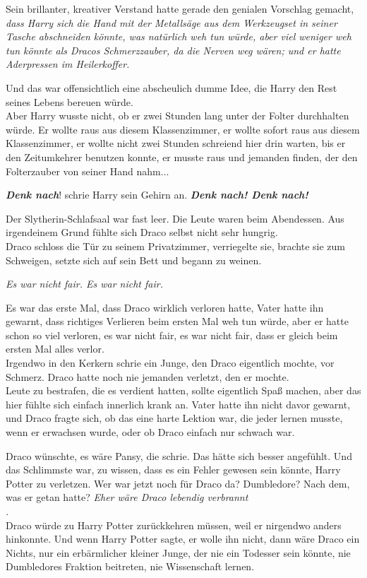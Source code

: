 {Sein brillanter, kreativer Verstand hatte gerade den genialen Vorschlag gemacht, \emph{dass Harry sich die Hand mit der Metallsäge aus dem Werkzeugset in seiner Tasche abschneiden könnte, was natürlich weh tun würde, aber viel weniger weh tun könnte als Dracos Schmerzzauber, da die Nerven weg wären; und er hatte Aderpressen im Heilerkoffer.}

Und das war offensichtlich eine abscheulich dumme Idee, die Harry den Rest seines Lebens bereuen würde.\\ Aber Harry wusste nicht, ob er zwei Stunden lang unter der Folter durchhalten würde. Er wollte raus aus diesem Klassenzimmer, er wollte sofort raus aus diesem Klassenzimmer, er wollte nicht zwei Stunden schreiend hier drin warten, bis er den Zeitumkehrer benutzen konnte, er musste raus und jemanden finden, der den Folterzauber von seiner Hand nahm...

\textbf{\emph{Denk nach}}! schrie Harry sein Gehirn an. \textbf{\emph{Denk nach! Denk nach!}}

Der Slytherin-Schlafsaal war fast leer. Die Leute waren beim Abendessen. Aus irgendeinem Grund fühlte sich Draco selbst nicht sehr hungrig.\\ Draco schloss die Tür zu seinem Privatzimmer, verriegelte sie, brachte sie zum Schweigen, setzte sich auf sein Bett und begann zu weinen.

\emph{Es war nicht fair. Es war nicht fair.}

Es war das erste Mal, dass Draco wirklich verloren hatte, Vater hatte ihn gewarnt, dass richtiges Verlieren beim ersten Mal weh tun würde, aber er hatte schon so viel verloren, es war nicht fair, es war nicht fair, dass er gleich beim ersten Mal alles verlor.\\ Irgendwo in den Kerkern schrie ein Junge, den Draco eigentlich mochte, vor Schmerz. Draco hatte noch nie jemanden verletzt, den er mochte.\\ Leute zu bestrafen, die es verdient hatten, sollte eigentlich Spaß machen, aber das hier fühlte sich einfach innerlich krank an. Vater hatte ihn nicht davor gewarnt, und Draco fragte sich, ob das eine harte Lektion war, die jeder lernen musste, wenn er erwachsen wurde, oder ob Draco einfach nur schwach war.

Draco wünschte, es wäre Pansy, die schrie. Das hätte sich besser angefühlt. Und das Schlimmste war, zu wissen, dass es ein Fehler gewesen sein könnte, Harry Potter zu verletzen. Wer war jetzt noch für Draco da? Dumbledore? Nach dem, was er getan hatte? \emph{Eher wäre Draco lebendig verbrannt}\\ \emph{.}\\ Draco würde zu Harry Potter zurückkehren müssen, weil er nirgendwo anders hinkonnte. Und wenn Harry Potter sagte, er wolle ihn nicht, dann wäre Draco ein Nichts, nur ein erbärmlicher kleiner Junge, der nie ein Todesser sein könnte, nie Dumbledores Fraktion beitreten, nie Wissenschaft lernen.

}
